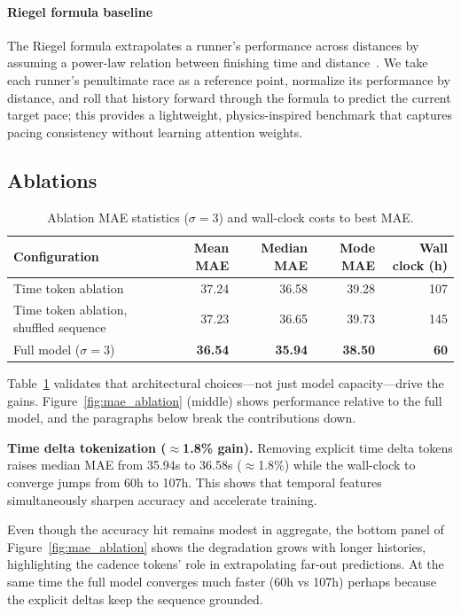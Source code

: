 \documentclass{article}
\begin{document}
\paragraph{Riegel formula baseline} The Riegel formula extrapolates a runner’s performance across distances by assuming a power-law relation between finishing time and distance~\cite{riegel1981predicting}. We take each runner’s penultimate race as a reference point, normalize its performance by distance, and roll that history forward through the formula to predict the current target pace; this provides a lightweight, physics-inspired benchmark that captures pacing consistency without learning attention weights.
\subsection{Ablations}
\begin{table}[h]
\centering
\caption{Ablation MAE statistics (\(\sigma=3\)) and wall-clock costs to best MAE.}
\label{tab:ablations}
\begin{tabular}{lrrrr}
\toprule
Configuration & Mean MAE & Median MAE & Mode MAE & Wall clock (h) \\
\midrule
Time token ablation & 37.24 & 36.58 & 39.28 & 107 \\
Time token ablation, shuffled sequence & 37.23 & 36.65 & 39.73 & 145 \\
Full model (\(\sigma=3\)) & \textbf{36.54} & \textbf{35.94} & \textbf{38.50} & \textbf{60} \\
\bottomrule
\end{tabular}
\end{table}

Table~\ref{tab:ablations} validates that architectural choices—not just model capacity—drive the gains. Figure~\ref{fig:mae_ablation} (middle) shows performance relative to the full model, and the paragraphs below break the contributions down.

\textbf{Time delta tokenization (\(\approx\)1.8\% gain).} Removing explicit time delta tokens raises median MAE from 35.94s to 36.58s (\(\approx\)1.8\%) while the wall-clock to converge jumps from 60h to 107h. This shows that temporal features simultaneously sharpen accuracy and accelerate training.

Even though the accuracy hit remains modest in aggregate, the bottom panel of Figure~\ref{fig:mae_ablation} shows the degradation grows with longer histories, highlighting the cadence tokens’ role in extrapolating far-out predictions. At the same time the full model converges much faster (60h vs 107h) perhaps because the explicit deltas keep the sequence grounded. 
\end{document}
